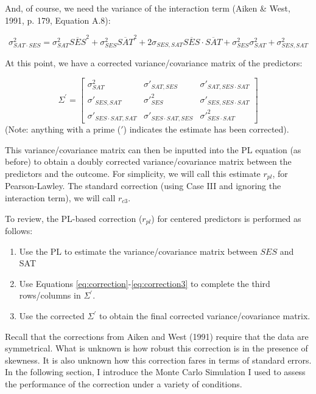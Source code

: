 \documentclass[english,man]{apa6}
\theoremstyle{definition}
\theoremstyle{definition}
\theoremstyle{remark}
\begin{document}
And, of course, we need the variance of the interaction term (Aiken \&
West, 1991, p. 179, Equation A.8):

\begin{equation}
\sigma^2_{SAT\cdot SES} = \sigma^2_{SAT}\overline{SES}^2 + \sigma^2_{SES}\overline{SAT}^2 + 2\sigma_{SES,SAT}\overline{SES}\cdot \overline{SAT} + \sigma^2_{SES}\sigma^2_{SAT} + \sigma^2_{SES,SAT}
\label{eq:correction3}
\end{equation}

At this point, we have a corrected variance/covariance matrix of the
predictors:

\[
   \Sigma^\prime=
  \left[ {\begin{array}{ccc}
   \sigma^2_{SAT} & \sigma\prime_{SAT,{SES}} & \sigma\prime_{SAT,SES\cdot SAT} \\
    \sigma\prime_{SES,SAT} & \sigma\prime^2_{SES} & \sigma\prime_{SES,SES\cdot SAT} \\
    \sigma\prime_{SES\cdot SAT,SAT} &\sigma\prime_{SES\cdot SAT,SES} & \sigma\prime^2_{SES\cdot SAT}
  \end{array} } \right]
\] \label{eq:matrix} \noindent (Note: anything with a prime (\(\prime\))
indicates the estimate has been corrected).

This variance/covariance matrix can then be inputted into the PL
equation (as before) to obtain a doubly corrected variance/covariance
matrix between the predictors and the outcome. For simplicity, we will
call this estimate \(r_{pl}\), for Pearson-Lawley. The standard
correction (using Case III and ignoring the interaction term), we will
call \(r_{c3}\).

To review, the PL-based correction (\(r_{pl}\)) for centered predictors
is performed as follows:

\begin{enumerate}
\item Use the PL to estimate the variance/covariance matrix between $SES$ and SAT
\item Use Equations \ref{eq:correction}-\ref{eq:correction3} to complete the third rows/columns in $\Sigma^\prime$.
\item Use the corrected $\Sigma^\prime$ to obtain the final corrected variance/covariance matrix. 
\end{enumerate}

Recall that the corrections from Aiken and West (1991) require that the
data are symmetrical. What is unknown is how robust this correction is
in the presence of skewness. It is also unknown how this correction
fares in terms of standard errors. In the following section, I introduce
the Monte Carlo Simulation I used to assess the performance of the
correction under a variety of conditions.
\end{document}
